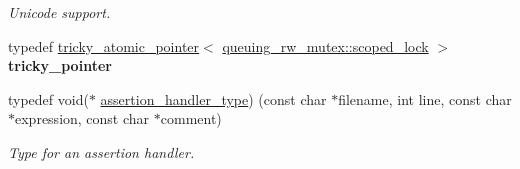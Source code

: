\begin{DoxyCompactItemize}
\begin{DoxyCompactList}\small\item\em Unicode support. \end{DoxyCompactList}\item 
\hypertarget{namespacetbb_abab1a8559dba9ec44a3deddacadb7d49}{}typedef \hyperlink{classtbb_1_1tricky__atomic__pointer}{tricky\+\_\+atomic\+\_\+pointer}$<$ \hyperlink{classtbb_1_1queuing__rw__mutex_1_1scoped__lock}{queuing\+\_\+rw\+\_\+mutex\+::scoped\+\_\+lock} $>$ {\bfseries tricky\+\_\+pointer}\label{namespacetbb_abab1a8559dba9ec44a3deddacadb7d49}

\item 
\hypertarget{namespacetbb_acce76b9d59c776788ddbd1588a18af42}{}typedef void($\ast$ \hyperlink{namespacetbb_acce76b9d59c776788ddbd1588a18af42}{assertion\+\_\+handler\+\_\+type}) (const char $\ast$filename, int line, const char $\ast$expression, const char $\ast$comment)\label{namespacetbb_acce76b9d59c776788ddbd1588a18af42}

\begin{DoxyCompactList}\small\item\em Type for an assertion handler. \end{DoxyCompactList}\end{DoxyCompactItemize}
